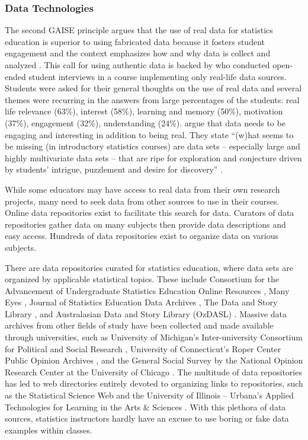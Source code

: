 \documentclass[11pt]{isuthesis}\usepackage[]{graphicx}\usepackage[]{color}
\begin{document}
\subsubsection{Data Technologies} 
\label{DataTech} 

The second GAISE principle argues that the use of real data for statistics education is superior to using fabricated data because it fosters student engagement  and the context emphasizes how and why data is collect and analyzed \citep{GAISEcollege}. This call for using authentic data is backed by \citet{Neumann2013} who conducted open-ended student interviews in a course implementing only real-life data sources. Students were asked for their general thoughts on the use of real data and several themes were recurring in the answers from large percentages of the students: real life relevance (63\%), interest (58\%), learning and memory (50\%), motivation (37\%), engagement (32\%), understanding (24\%). \citet{Finzer2007} argue that data needs to be engaging and interesting in addition to being real.  They state ``(w)hat seems to be missing (in introductory statistics courses) are data sets -- especially large and highly multivariate data sets -- that are ripe for exploration and conjecture driven by students' intrigue, puzzlement and desire for discovery'' \citep[p.1]{Finzer2007}.  

While some educators may have access to real data from their own research projects, many need to seek data from other sources to use in their courses. Online data repositories exist to facilitate this search for data. Curators of data repositories gather data on many subjects then provide data descriptions and easy access. Hundreds of data repositories exist to organize data on various subjects. 

There are data repositories curated for statistics education, where data sets are organized by applicable statistical topics. These include Consortium for the Advancement of Undergraduate Statistics Education Online Resources \citep{CAUSErepo}, Many Eyes \citep{ManyEyes}, Journal of Statistics Education Data Archives \citep{JSErepo}, The Data and Story Library \citep{DASL}, and Australasian Data and Story Library (OzDASL) \citep{OzDASL}. Massive data archives from other fields of study have been collected and made available through universities, such as University of Michigan's Inter-university Consortium for Political and Social Research \citep{ICPSR}, University of Connecticut's Roper Center Public Opinion Archives \citep{Roper}, and the General Social Survey by the National Opinion Research Center at the University of Chicago \citep{GSS}. The multitude of data repositories has led to web directories entirely devoted to organizing links to repositories, such as the Statistical Science Web \citep{SSW} and the University of Illinois -- Urbana's Applied Technologies for Learning in the Arts \& Sciences \citep{ATLAS}.  With this plethora of data sources, statistics instructors hardly have an excuse to use boring or fake data examples within classes. 
\end{document}
